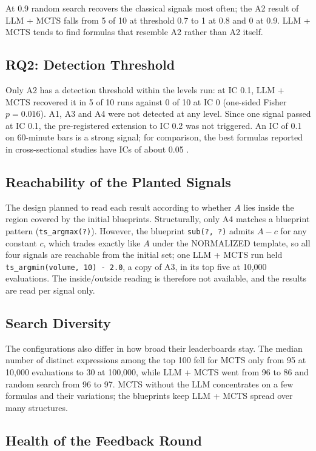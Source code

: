 \documentclass[12pt,a4paper,oneside]{book}
\theoremstyle{definition}
\newcommand{\code}[1]{\texttt{#1}}
\begin{document}
At 0.9 random search recovers the classical signals most often; the A2 result of LLM + MCTS falls from 5 of 10 at threshold 0.7 to 1 at 0.8 and 0 at 0.9. LLM + MCTS tends to find formulas that resemble A2 rather than A2 itself.

\subsection{RQ2: Detection Threshold}

Only A2 has a detection threshold within the levels run: at IC 0.1, LLM + MCTS recovered it in 5 of 10 runs against 0 of 10 at IC 0 (one-sided Fisher $p = 0.016$). A1, A3 and A4 were not detected at any level. Since one signal passed at IC 0.1, the pre-registered extension to IC 0.2 was not triggered. An IC of 0.1 on 60-minute bars is a strong signal; for comparison, the best formulas reported in cross-sectional studies have ICs of about 0.05 \cite{shi2026}.

\subsection{Reachability of the Planted Signals}

The design planned to read each result according to whether $A$ lies inside the region covered by the initial blueprints. Structurally, only A4 matches a blueprint pattern (\code{ts\_argmax(?)}). However, the blueprint \code{sub(?, ?)} admits $A - c$ for any constant $c$, which trades exactly like $A$ under the NORMALIZED template, so all four signals are reachable from the initial set; one LLM + MCTS run held \code{ts\_argmin(volume, 10) - 2.0}, a copy of A3, in its top five at 10,000 evaluations. The inside/outside reading is therefore not available, and the results are read per signal only.

\subsection{Search Diversity}

The configurations also differ in how broad their leaderboards stay. The median number of distinct expressions among the top 100 fell for MCTS only from 95 at 10,000 evaluations to 30 at 100,000, while LLM + MCTS went from 96 to 86 and random search from 96 to 97. MCTS without the LLM concentrates on a few formulas and their variations; the blueprints keep LLM + MCTS spread over many structures.

\subsection{Health of the Feedback Round}
\end{document}
